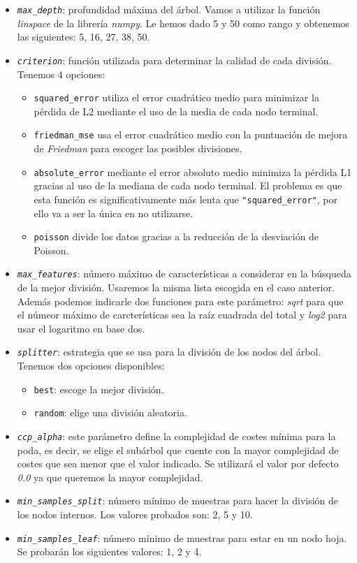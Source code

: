 \begin{itemize}
    \item \texttt{\textit{max\_depth}}: profundidad máxima del árbol. Vamos a utilizar la función \textit{linspace} de la librería \textit{numpy}. Le hemos dado 5 y 50 como rango y obtenemos las siguientes: 5, 16, 27, 38, 50.
    \item \texttt{\textit{criterion}}: función utilizada para determinar la calidad de cada división. Tenemos 4 opciones:
        \begin{itemize}
            \item \texttt{squared\_error} utiliza el error cuadrático medio para minimizar la pérdida de L2 mediante el uso de la media de cada nodo terminal.
            \item \texttt{friedman\_mse} usa el error cuadrático medio con la puntuación de mejora de \textit{Friedman} para escoger las posibles divisiones.
            \item \texttt{absolute\_error} mediante el error absoluto medio  minimiza la pérdida L1 gracias al uso de la mediana de cada nodo terminal. El problema es que esta función es significativamente más lenta que \texttt{"squared\_error"}, por ello va a ser la única en no utilizarse.
            \item \texttt{poisson} divide los datos gracias a la reducción de la desviación de Poisson. 
        \end{itemize}
    \item \texttt{\textit{max\_features}}: número máximo de características a considerar en la búsqueda de la mejor división. Usaremos la misma lista escogida en el caso anterior.
    Además podemos indicarle dos funciones para este parámetro: \textit{sqrt} para que el númeor máximo de carcterísticas sea la raíz cuadrada del total y \textit{log2} para usar el logaritmo en base dos.
    \item \texttt{\textit{splitter}}: estrategia que se usa para la división de los nodos del árbol. Tenemos dos opciones disponibles:
        \begin{itemize}
            \item \texttt{best}: escoge la mejor división.
            \item \texttt{random}: elige una división aleatoria.
        \end{itemize}
    \item \texttt{\textit{ccp\_alpha}}: este parámetro define la complejidad de costes mínima para la poda, es decir, se elige el subárbol que cuente con la mayor complejidad de costes que sea menor que el valor indicado. Se utilizará el valor por defecto \textit{0.0} ya que queremos la mayor complejidad.
    \item\texttt{\textit{min\_samples\_split}}: número mínimo de muestras para hacer la división de los nodos internos. Los valores probados son: 2, 5 y 10.
    \item \texttt{\textit{min\_samples\_leaf}}: número mínimo de muestras para estar en un nodo hoja. Se probarán los siguientes valores: 1, 2 y 4.
\end{itemize}
